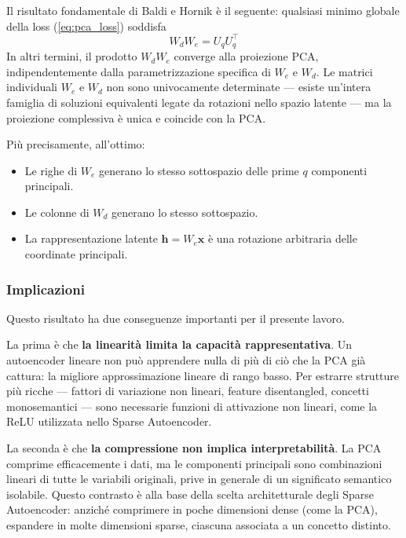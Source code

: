 Il risultato fondamentale di Baldi e Hornik è il seguente: qualsiasi minimo globale della loss (\ref{eq:pca_loss}) soddisfa
\begin{equation}
    W_d W_e = U_q U_q^\top
\end{equation}
In altri termini, il prodotto $W_d W_e$ converge alla proiezione PCA, indipendentemente dalla parametrizzazione specifica di $W_e$ e $W_d$. Le matrici individuali $W_e$ e $W_d$ non sono univocamente determinate --- esiste un'intera famiglia di soluzioni equivalenti legate da rotazioni nello spazio latente --- ma la proiezione complessiva è unica e coincide con la PCA.

Più precisamente, all'ottimo:
\begin{itemize}[itemsep=0.3em]
    \item Le righe di $W_e$ generano lo stesso sottospazio delle prime $q$ componenti principali.
    \item Le colonne di $W_d$ generano lo stesso sottospazio.
    \item La rappresentazione latente $\mathbf{h} = W_e \mathbf{x}$ è una rotazione arbitraria delle coordinate principali.
\end{itemize}

\subsubsection{Implicazioni}

Questo risultato ha due conseguenze importanti per il presente lavoro.

La prima è che \textbf{la linearità limita la capacità rappresentativa}. Un autoencoder lineare non può apprendere nulla di più di ciò che la PCA già cattura: la migliore approssimazione lineare di rango basso. Per estrarre strutture più ricche --- fattori di variazione non lineari, feature disentangled, concetti monosemantici --- sono necessarie funzioni di attivazione non lineari, come la ReLU utilizzata nello Sparse Autoencoder.

La seconda è che \textbf{la compressione non implica interpretabilità}. La PCA comprime efficacemente i dati, ma le componenti principali sono combinazioni lineari di tutte le variabili originali, prive in generale di un significato semantico isolabile. Questo contrasto è alla base della scelta architetturale degli Sparse Autoencoder: anziché comprimere in poche dimensioni dense (come la PCA), espandere in molte dimensioni sparse, ciascuna associata a un concetto distinto.

